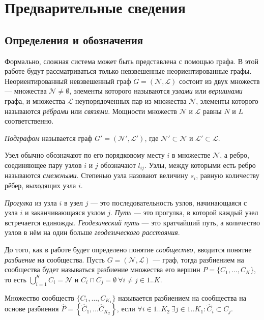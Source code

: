 \section{Предварительные сведения}
\label{sec:intro}


\subsection{Определения и обозначения}

Формально, сложная система может быть представлена с помощью графа. В этой работе будут рассматриваться только невзвешенные неориентированные графы. Неориентированный невзвешенный граф $G = (\mathscr{N}, \mathscr{L})$ состоит из двух множеств --- множества $\mathscr{N} \ne \emptyset$, элементы которого называются \emph{узлами} или \emph{вершинами} графа, и множества $\mathscr{L}$ неупорядоченных пар из множества $\mathscr{N}$, элементы которого называются \emph{рёбрами} или \emph{связями}. Мощности множеств $\mathscr{N}$ и $\mathscr{L}$ равны $N$ и $L$ соответственно.

\emph{Подграфом} называется граф $G' = (\mathscr{N}', \mathscr{L}')$, где $\mathscr{N}' \subset \mathscr{N}$ и $\mathscr{L}' \subset \mathscr{L}$.

Узел обычно обозначают по его порядковому месту $i$ в множестве $\mathscr{N}$, а ребро, соединяющее пару узлов $i$ и $j$ обозначают $l_{ij}$. Узлы, между которыми есть ребро называются \emph{смежными}. Степенью узла назовают величину $s_i$, равную количеству рёбер, выходящих узла $i$.

\emph{Прогулка} из узла $i$ в узел $j$ --- это последовательность узлов, начинающаяся с узла $i$ и заканчивающаяся узлом $j$. \emph{Путь} --- это прогулка, в которой каждый узел встречается единожды. \emph{Геодезический путь} --- это кратчайший путь, а количество узлов в нём на один больше \emph{геодезического расстояния}.

До того, как в работе будет определено понятие \emph{сообщество}, вводится понятие \emph{разбиение} на сообщества. Пусть $G = (\mathscr{N}, \mathscr{L})$ --- граф, тогда разбиением на сообщества будет называться разбиение множества его вершин $P = \{C_1, \dots, C_K\}$, то есть $\bigcup_{i = 1}^K C_i = \mathscr{N}$ и $C_i \cap C_j = \emptyset \ \forall i \neq j \in 1..K$.

Множество сообществ $\{C_1, \dots, C_{K_1}\}$ называется разбиением на сообщества на основе разбиения $\hat{P} = \left\{\hat{C}_1, \dots \hat{C}_{K_2}\right\}$, если $\forall i \in 1..K_2\ \exists j \in 1..K_1: \hat{C}_i \subset C_j$.


